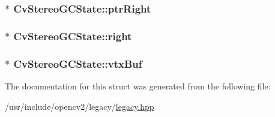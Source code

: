 \hypertarget{structCvStereoGCState_a72a4375a625d180a8d4670d8f40d8eac}{
\subsubsection[{ptr\-Right}]{$\ast$ Cv\-Stereo\-G\-C\-State\-::ptr\-Right}}\label{structCvStereoGCState_a72a4375a625d180a8d4670d8f40d8eac}
\hypertarget{structCvStereoGCState_a0de1cdbbff1f05aed8f73b6d0d30dc27}{
\subsubsection[{right}]{$\ast$ Cv\-Stereo\-G\-C\-State\-::right}}\label{structCvStereoGCState_a0de1cdbbff1f05aed8f73b6d0d30dc27}
\hypertarget{structCvStereoGCState_a1fb806f995a7314ace15ace55d061d4e}{
\subsubsection[{vtx\-Buf}]{$\ast$ Cv\-Stereo\-G\-C\-State\-::vtx\-Buf}}\label{structCvStereoGCState_a1fb806f995a7314ace15ace55d061d4e}


The documentation for this struct was generated from the following file\-:\begin{DoxyCompactItemize}
\item 
/usr/include/opencv2/legacy/\hyperlink{legacy_8hpp}{legacy.\-hpp}\end{DoxyCompactItemize}
